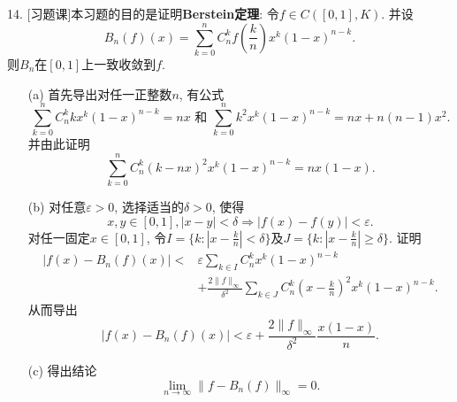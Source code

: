 \documentclass[a4paper,8pt]{ctexart}\textwidth 140mm \textheight 216mm
\newcommand{\e}{\varepsilon}
\newcommand{\8}{\infty}
\begin{document}
14. [习题课]本习题的目的是证明\textbf{Berstein定理}: 令$f\in C([0,1],K)$. 并设
$$B_n(f)(x)=\sum_{k=0}^n C_n^kf\left(\frac{k}{n}\right)x^k(1-x)^{n-k}.$$
则$B_n$在$[0,1]$上一致收敛到$f$.
\begin{enumerate}
	\item[(a)] 首先导出对任一正整数$n$, 有公式
	\begin{equation*}
		\sum_{k=0}^n C_n^kkx^k(1-x)^{n-k}=nx\mbox{ 和 }\sum_{k=0}^n k^2x^k(1-x)^{n-k}=nx+n(n-1)x^2.
	\end{equation*}
	并由此证明
	$$\sum_{k=0}^n C_n^k(k-nx)^2x^k(1-x)^{n-k}=nx(1-x).$$
	\item[(b)] 对任意$\e>0$, 选择适当的$\delta>0$, 使得
	\begin{equation*}
		x,y\in[0,1],|x-y|<\delta\Rightarrow|f(x)-f(y)|<\e.
	\end{equation*}
	对任一固定$x\in[0,1]$, 令$I=\{k:|x-\frac{k}{n}|<\delta\}$及$J=\{k:|x-\frac{k}{n}|\geq\delta\}$. 证明
	\begin{equation*}
		\begin{split}
		|f(x)-B_n(f)(x)|<&\e\sum_{k\in I}C_n^kx^k(1-x)^{n-k}\\
		&+\frac{2\|f\|_\infty}{\delta^2}\sum_{k\in J}C_n^k\left(x-\frac{k}{n}\right)^2x^k(1-x)^{n-k}.
		\end{split}
	\end{equation*}
	从而导出
	\[|f(x)-B_n(f)(x)|<\e+\frac{2\|f\|_\infty}{\delta^2}\frac{x(1-x)}{n}.\]
	
	(c) 得出结论
	$$\lim_{n\to\infty}\|f-B_n(f)\|_\infty=0.$$
\end{enumerate}
\end{document}
